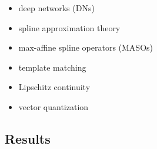 \documentclass{article}
\begin{document}
\begin{itemize}
	\item deep networks (DNs)
	\item spline approximation theory
	\item max-affine spline operators (MASOs)
	\item template matching
	\item Lipschitz continuity
	\item vector quantization
\end{itemize}


\subsection{Results}
\end{document}

